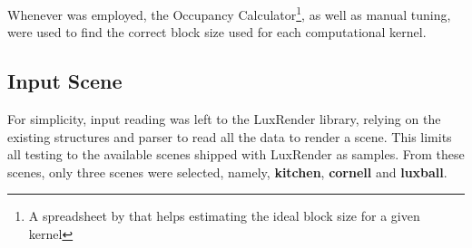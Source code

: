 \documentclass[main.tex]{subfiles}
\begin{document}
Whenever \cuda was employed, the \cuda Occupancy Calculator\footnote{A spreadsheet by \nvidia that helps estimating the ideal block size for a given kernel}, as well as manual tuning, were used to find the correct block size used for each computational kernel.

\subsection{Input Scene}

For simplicity, input reading was left to the LuxRender library, relying on the existing structures and parser to read all the data to render a scene. This limits all testing to the available scenes shipped with LuxRender as samples. From these scenes, only three scenes were selected, namely, \textbf{kitchen}, \textbf{cornell} and \textbf{luxball}.
\end{document}
